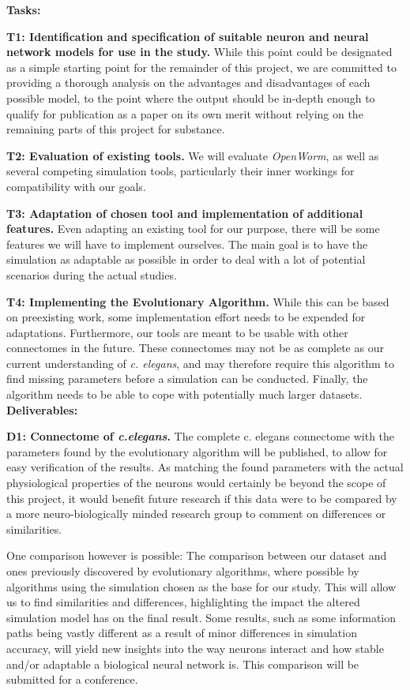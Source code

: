 \documentclass[a4paper,11pt]{article}
\begin{document}
\textbf{Tasks:}

\textbf{T1: Identification and specification of suitable neuron and neural network models for use in the study.}
While this point could be designated as a simple starting point for the remainder of this project, we are committed to providing a thorough analysis on the advantages and disadvantages of each possible model, to the point where the output should be in-depth enough to qualify for publication as a paper on its own merit without relying on the remaining parts of this project for substance.

\textbf{T2: Evaluation of existing tools.}
We will evaluate \emph{OpenWorm}, as well as several competing simulation tools, particularly their inner workings for compatibility with our goals.

\textbf{T3: Adaptation of chosen tool and implementation of additional features.}
Even adapting an existing tool for our purpose, there will be some features we will have to implement ourselves. The main goal is to have the simulation as adaptable as possible in order to deal with a lot of potential scenarios during the actual studies.

\textbf{T4: Implementing the Evolutionary Algorithm.} While this can be based on preexisting work, some implementation effort needs to be expended for adaptations. Furthermore, our tools are meant to be usable with other connectomes in the future. These connectomes may not be as complete as our current understanding of \emph{c. elegans}, and may therefore require this algorithm to find missing parameters before a simulation can be conducted. Finally, the algorithm needs to be able to cope with potentially much larger datasets.
\\[0,2cm]



\textbf{Deliverables:}

\textbf{D1: Connectome of \emph{c.elegans}.}
The complete c. elegans connectome with the parameters found by the evolutionary algorithm will be published, to allow for easy verification of the results. As matching the found parameters with the actual physiological properties of the neurons would certainly be beyond the scope of this project, it would benefit future research if this data were to be compared by a more neuro-biologically minded research group to comment on differences or similarities.

One comparison however is possible: The comparison between our dataset and ones previously discovered by evolutionary algorithms, where possible by algorithms using the simulation chosen as the base for our study. This will allow us to find similarities and differences, highlighting the impact the altered simulation model has on the final result. Some results, such as some information paths being vastly different as a result of minor differences in simulation accuracy, will yield new insights into the way neurons interact and how stable and/or adaptable a biological neural network is. This comparison will be submitted for a conference. 
\end{document}
